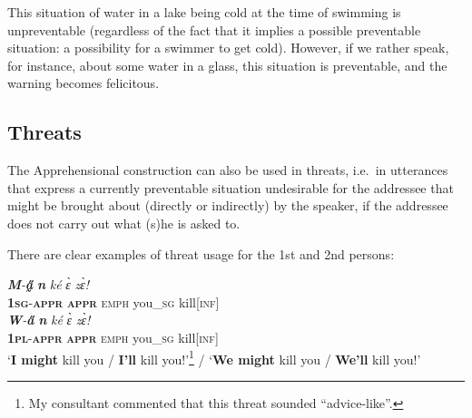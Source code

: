 \documentclass[output=paper,colorlinks,citecolor=brown
]{langscibook}
\begin{document}
\noindent This situation of water in a lake being cold at the time of swimming is unpreventable (regardless of the fact that it implies a possible preventable situation: a possibility for a swimmer to get cold). However, if we rather speak, for instance, about some water in a glass, this situation is preventable, and the warning becomes felicitous.


\subsection{Threats}
\label{subsec:threats}

The Apprehensional construction can also be used in threats, i.e.\ in utterances that express a currently preventable situation undesirable for the addressee that might be brought about (directly or indirectly) by the speaker, if the addressee does not carry out what (s)he is asked to.

There are clear examples of threat usage for the 1st and 2nd persons:

\z



\ea \label{ex:Fed32}
\ea \label{ex:Fed32a}
\gll \textit{\textbf{M}-\textbf{a̰̋}} \textit{\textbf{n{\ù}}} \textit{ké} \textit{ɛ̀} \textit{zɛ̀!} \\
\textsc{\textbf{1sg}-\textbf{appr}} \textsc{\textbf{appr}} \textsc{emph} you\_\textsc{sg} kill\textsc{[inf]} \\
\ex \label{ex:Fed32b}
\gll \textit{\textbf{W}-\textbf{a̋}} \textit{\textbf{n{\ù}}} \textit{ké} \textit{ɛ̀} \textit{zɛ̀!} \\
\textsc{\textbf{1pl}-\textbf{appr}} \textsc{\textbf{appr}} \textsc{emph} you\_\textsc{sg} kill\textsc{[inf]} \\
 `\textbf{I might} kill you / \textbf{I'll} kill you!'\footnote{My consultant commented that this threat sounded ``advice-like''.} / `\textbf{We might} kill you / \textbf{We'll} kill you!'
\z
\z
\end{document}
